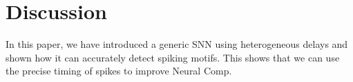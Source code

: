 \documentclass[runningheads]{llncs}
\newcommand{\kernel}{K} %
\newcommand{\fig}[1]{Fig.~\ref{fig:#1}}%
\begin{document}

%
\section{Discussion}
%
In this paper, we have introduced a generic SNN using heterogeneous delays and shown how it can accurately detect spiking motifs. This shows that we can use the precise timing of spikes to improve Neural Comp. 
%
\end{document}
